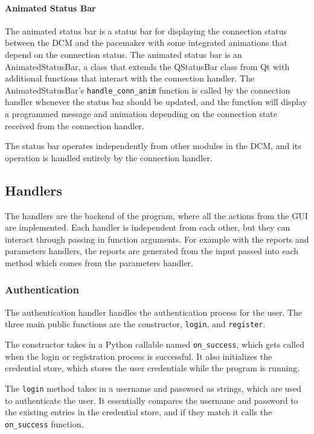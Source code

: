 \documentclass[12pt]{article}
\begin{document}
\paragraph{Animated Status Bar}
The animated status bar is a status bar for displaying the connection status between the DCM and the pacemaker with some integrated animations that depend on the connection status. The animated status bar is an AnimatedStatusBar, a class that extends the QStatusBar class from Qt with additional functions that interact with the connection handler. The AnimatedStatusBar's \verb|handle_conn_anim| function is called by the connection handler whenever the status bar should be updated, and the function will display a programmed message and animation depending on the connection state received from the connection handler.

The status bar operates independently from other modules in the DCM, and its operation is handled entirely by the connection handler.

\subsection{Handlers}
The handlers are the backend of the program, where all the actions from the GUI are implemented. Each handler is independent from each other, but they can interact through passing in function arguments. For example with the reports and parameters handlers, the reports are generated from the input passed into each method which comes from the parameters handler.

\subsubsection{Authentication}
The authentication handler handles the authentication process for the user. The three main public functions are the constructor, \verb|login|, and \verb|register|.

The constructor takes in a Python callable named \verb|on_success|, which gets called when the login or registration process is successful.
It also initializes the credential store, which stores the user credentials while the program is running.

The \verb|login| method takes in a username and password as strings, which are used to authenticate the user. It essentially compares the username and password to the existing entries in the credential store, and if they match it calls the \verb|on_success| function.
\end{document}
